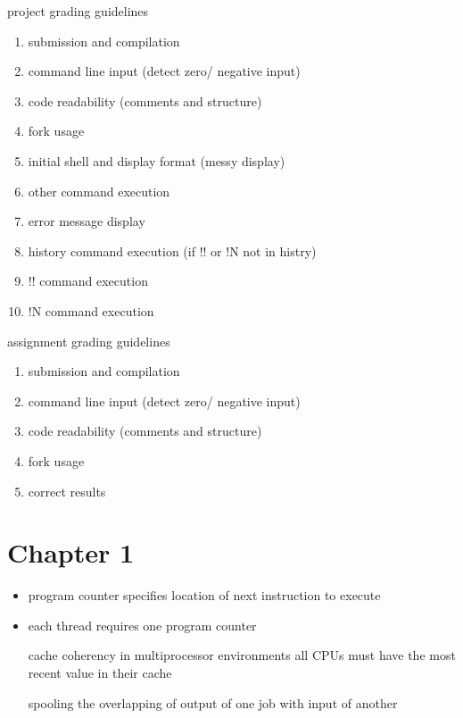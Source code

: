 \documentclass[11pt]{article}
\author{ethan}
\date{\today}
\title{}
\begin{document}
\tableofcontents

project grading guidelines
\begin{enumerate}
\item submission and compilation
\item command line input (detect zero/ negative input)
\item code readability (comments and structure)
\item fork usage
\item initial shell and display format (messy display)
\item other command execution
\item error message display
\item history command execution (if !! or !N not in histry)
\item !! command execution
\item !N command execution
\end{enumerate}

assignment grading guidelines
\begin{enumerate}
\item submission and compilation
\item command line input (detect zero/ negative input)
\item code readability (comments and structure)
\item fork usage
\item correct results
\end{enumerate}
\section{Chapter 1}
\label{sec:org043aef6}
\begin{itemize}
\item program counter specifies location of next instruction to execute
\item each thread requires one program counter

\item[{cache coherency}] in multiprocessor environments all CPUs must have the most recent value in their cache
\item[{spooling}] the overlapping of output of one job with input of another
\end{itemize}
\end{document}
